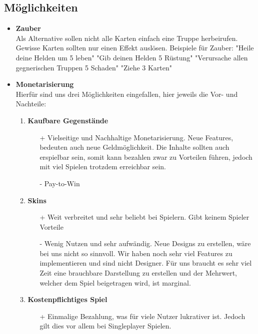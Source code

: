 \subsection{Möglichkeiten}
\begin{itemize}
    \item \textbf{Zauber} \\
        Als Alternative sollen nicht alle Karten einfach eine Truppe herbeirufen. Gewisse Karten sollten nur einen Effekt auslösen.
        Beispiele für Zauber:
            "Heile deine Helden um 5 leben"
            "Gib deinen Helden 5 Rüstung"
            "Verursache allen gegnerischen Truppen 5 Schaden"
            "Ziehe 3 Karten"
    \item \textbf{Monetarisierung} \\
    Hierfür sind uns drei Möglichkeiten eingefallen, hier jeweils die Vor- und Nachteile:
    \begin{enumerate}
        \item \textbf{Kaufbare Gegenstände}
        \begin{itemize}
            \item[+] Vielseitige und Nachhaltige Monetarisierung. Neue Features, bedeuten auch neue Geldmöglichkeit. Die Inhalte sollten
                     auch erspielbar sein, somit kann bezahlen zwar zu Vorteilen führen, jedoch mit viel Spielen trotzdem erreichbar sein.
            \item[-] Pay-to-Win
        \end{itemize}
        \item \textbf{Skins}
        \begin{itemize}
            \item[+] Weit verbreitet und sehr beliebt bei Spielern. Gibt keinem Spieler Vorteile
            \item[-] Wenig Nutzen und sehr aufwändig. Neue Designs zu erstellen, wäre bei uns nicht so sinnvoll.
                     Wir haben noch sehr viel Features zu implementieren und sind nicht Designer. Für uns braucht es sehr
                     viel Zeit eine brauchbare Darstellung zu erstellen und der Mehrwert, welcher dem Spiel beigetragen wird, ist marginal.
        \end{itemize}
        \item \textbf{Kostenpflichtiges Spiel}
        \begin{itemize}
            \item[+] Einmalige Bezahlung, was für viele Nutzer lukrativer ist. Jedoch gilt dies vor allem bei Singleplayer Spielen.

\end{itemize}
\end{enumerate}
\end{itemize}

